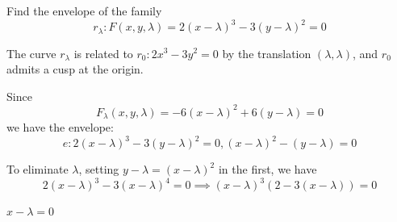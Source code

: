 \documentclass[11pt]{amsbook}
\begin{document}
\begin{exmp}
	Find the envelope of the family
	\[
		r_\lambda: F(x, y, \lambda) = 2 (x - \lambda)^3 - 3 (y - \lambda)^2 = 0
	\]

	\begin{hSolution}
		The curve $r_\lambda$ is related to $r_0: 2x^3 - 3y^2 = 0$
		by the translation $(\lambda, \lambda)$, and $r_0$ admits a cusp\footnotemark
		at the origin.\\

		\begin{minipage}{0.69\textwidth}
			Since
			\[
				F_\lambda(x, y, \lambda) = -6 (x - \lambda)^2 + 6 (y - \lambda) = 0
			\]
			we have the envelope:
			\[
				e: 2 (x - \lambda)^3 - 3 (y - \lambda)^2 = 0,
				(x - \lambda)^2 - (y - \lambda) = 0
			\]

			To eliminate $\lambda$, setting $y - \lambda = (x - \lambda)^2$
			in the first, we have
			\[
				2 (x - \lambda)^3 - 3 (x - \lambda)^4 = 0
				\implies
				(x - \lambda)^3 (2 - 3 (x - \lambda)) = 0
			\]

			\begin{multicols}{2}
				\begin{hEnumerateRoman}
					\item
					\begin{center}
						$x - \lambda = 0$
					\end{center}


\end{hEnumerateRoman}
\end{multicols}
\end{minipage}
\end{hSolution}
\end{exmp}
\end{document}
